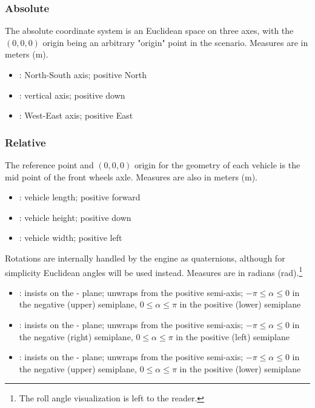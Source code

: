 \subsubsection{Absolute}

The absolute coordinate system is an Euclidean space on three axes, with the $(0,0,0)$ origin being an arbitrary "origin" point in the scenario. Measures are in meters (\si{\meter}).

\begin{itemize}
	\item {}: North-South axis; positive North
	\item {}: vertical axis; positive down
	\item {}: West-East axis; positive East
\end{itemize}

\subsubsection{Relative}

The reference point and $(0,0,0)$ origin for the geometry of each vehicle is the mid point of the front wheels axle. Measures are also in meters (\si{\meter}).

\begin{itemize}
	\item {}: vehicle length; positive forward
	\item {}: vehicle height; positive down
	\item {}: vehicle width; positive left
\end{itemize}

Rotations are internally handled by the engine as quaternions, although for simplicity Euclidean angles will be used instead. Measures are in radians (\si{\radian}).\footnote{The roll angle visualization is left to the reader.}

\begin{itemize}
	\item {}: insists on the - plane; unwraps from the positive  semi-axis; $-\pi \leqslant \alpha \leqslant 0$ in the negative (upper) semiplane, $0 \leqslant \alpha \leqslant \pi$ in the positive (lower) semiplane
	\item {}: insists on the - plane; unwraps from the positive  semi-axis; $-\pi \leqslant \alpha \leqslant 0$ in the negative (right) semiplane, $0 \leqslant \alpha \leqslant \pi$ in the positive (left) semiplane
	\item {}: insists on the - plane; unwraps from the positive  semi-axis; $-\pi \leqslant \alpha \leqslant 0$ in the negative (upper) semiplane, $0 \leqslant \alpha \leqslant \pi$ in the positive (lower) semiplane
\end{itemize}

